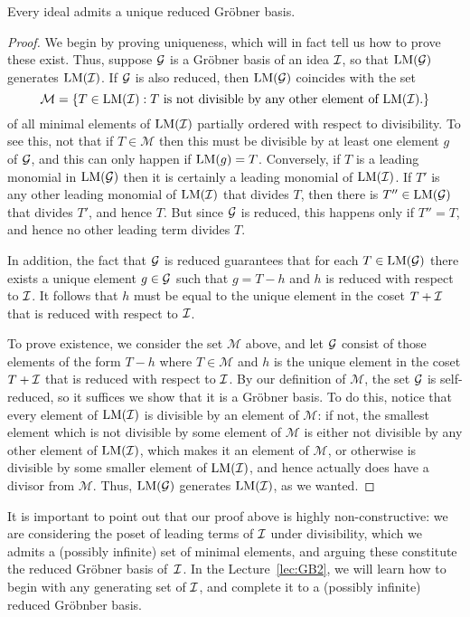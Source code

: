 \begin{theorem}
Every ideal admits a unique reduced Gr\"obner basis.
\end{theorem}

\begin{proof}
We begin by proving uniqueness, which will in fact tell us
how to prove these exist. Thus, suppose $\mathcal G$ is a 
Gr\"obner basis of an idea $\mathcal{I}$, so that
$\operatorname{LM}(\mathcal G)$ generates $\operatorname{LM}(\mathcal{I})$. If $\mathcal G$ is
also reduced, then $\operatorname{LM}(\mathcal G)$ coincides with the set
\[ 
 \mathcal M = \{ T\in \operatorname{LM}(\mathcal{I}) : \text{$T$ is not divisible by any
 other element of  $\operatorname{LM}(\mathcal{I})$}.
 	\}
	\]
of all minimal elements of $\operatorname{LM}(\mathcal{I})$ partially ordered
with respect to divisibility. To see this, not that if
$T\in \mathcal M$ then this must be divisible by at least
one element $g$ of $\mathcal G$, and this can only happen 
if $\operatorname{LM}(g) = T$. Conversely, if $T$ is a leading monomial
in $\operatorname{LM}(\mathcal G)$ then it is certainly a leading monomial
of $\operatorname{LM}(\mathcal{I})$. If $T'$ is any other
leading monomial of $\operatorname{LM}(\mathcal{I})$ that divides $T$, then there is
$T''\in \operatorname{LM}(\mathcal G)$ that divides $T'$, and hence $T$. But
since $\mathcal G$ is reduced, this happens only if $T''=T$, and
hence no other leading term divides $T$.

In addition, the fact that $\mathcal G$ is reduced guarantees
that for each $T\in\operatorname{LM}(\mathcal G)$ there exists a unique element
$g\in\mathcal G$ such that $g= T-h$ and $h$ is reduced with
respect to $\mathcal{I}$. It follows that $h$ must be equal to the
unique element in the coset $T+\mathcal{I}$ that is reduced
with respect to $\mathcal{I}$.

To prove existence, we consider the set $\mathcal{M}$ above,
and let $\mathcal G$ consist of those elements of the form $T-h$
where $T\in \mathcal{M}$ and $h$ is the unique element in
the coset $T+\mathcal{I}$ that is reduced with respect to $\mathcal{I}$. 
By our definition of $\mathcal M$, the set $\mathcal G$ is self-reduced, 
so it suffices we show that it is a Gr\"obner basis. 
To do this, notice that every element of $\operatorname{LM}(\mathcal{I})$
is divisible by an element of $\mathcal M$: if not,
the smallest element which is not divisible by some
element of $\mathcal M$ is either not divisible by
any other element of $\operatorname{LM}(\mathcal{I})$, which makes it an element
of $\mathcal M$, or otherwise is divisible by some
smaller element of $\operatorname{LM}(\mathcal{I})$, and hence actually
does have a divisor from $\mathcal M$. Thus,
$\operatorname{LM}(\mathcal G)$ generates $\operatorname{LM}(\mathcal{I})$, as we wanted.
\end{proof}

It is important to point out that our proof above is highly
non-constructive: we are considering the poset of
leading terms of $\mathcal{I}$ under divisibility, 
which we admits a (possibly infinite) set of 
minimal elements, and arguing these constitute the
reduced Gr\"obner basis of~$\mathcal{I}$. In the Lecture~\ref{lec:GB2}, we will learn how to begin with any generating
set of $\mathcal{I}$, and complete it to a (possibly infinite)
reduced Gr\"obnber basis.
 
